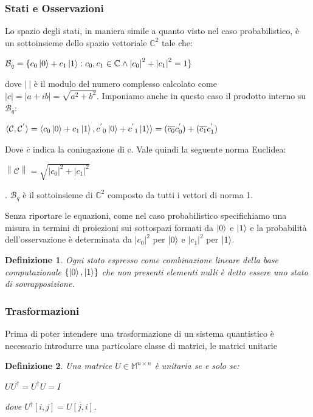 \documentclass[12pt,a4paper,openright]{report}
\newcommand{\norm}[1]{\left\lVert#1\right\rVert}
\newtheorem{mydef}{Definizione}[chapter]
\begin{document}
\subsubsection{Stati e Osservazioni}

Lo spazio degli stati, in maniera simile a quanto visto nel caso probabilistico, è un sottoinsieme dello spazio vettoriale $\mathbb{C}^2$ tale che:
\begin{center}
    $\mathcal{B}_q=\{c_0\ket0 + c_1\ket1 : c_0,c_1 \in \mathbb{C} \land {\left\vert{c_0}\right\vert}^2 + {\left\vert{c_1}\right\vert}^2 = 1 \} $
\end{center}
dove $\left\vert{\:}\right\vert$ è il modulo del numero complesso calcolato come $\left\vert{c}\right\vert = \left\vert{a + ib}\right\vert = \sqrt{a^2 + b^2}$.
Imponiamo anche in questo caso il prodotto interno su $\mathcal{B}_q$:
\begin{center}
    $\langle\mathcal{C},\mathcal{C^{'}}\rangle=\langle c_0\ket0 + c_1\ket1, {c^{'}}_0\ket0 + {c^{'}}_1\ket1 \rangle = (\overline{c_0}c^{'}_0) + (\overline{c_1}c^{'}_1)$
\end{center}
Dove $\overline{c}$ indica la coniugazione di c. Vale quindi la seguente norma Euclidea:
\begin{center}
    $\norm{\mathcal{C}}= \sqrt{{\left\vert{c_0}\right\vert}^2 + {\left\vert{c_1}\right\vert}^2}$
\end{center}
. $\mathcal{B}_q$ è il sottoinsieme di $\mathbb{C}^2$ composto da tutti i vettori di norma 1.\par
Senza riportare le equazioni, come nel caso probabilistico specifichiamo una misura in termini di proiezioni sui sottospazi formati da $\ket0$ e $\ket1$ e la probabilità 
dell'osservazione è determinata da ${\left\vert{c_0}\right\vert}^2$ per $\ket0$ e  ${\left\vert{c_1}\right\vert}^2$ per $\ket1$.

\begin{mydef}
    Ogni stato espresso come combinazione lineare della base computazionale $\{\ket0,\ket1\}$ che non presenti elementi nulli è detto essere uno 
    stato di sovrapposizione.
\end{mydef}
\subsubsection{Trasformazioni}
Prima di poter intendere una trasformazione di un sistema quantistico è necessario introdurre una particolare classe di matrici, le matrici unitarie
\begin{mydef}
    Una matrice $U\in\mathbb{M}^{n\times{n}}$ è unitaria se e solo se:
    \begin{center}
        $UU^\dag=U^{\dag}U=I$
    \end{center} 
    dove $U^{\dag}[i,j]=\overline{U[j,i]}$.
\end{mydef}
\end{document}
